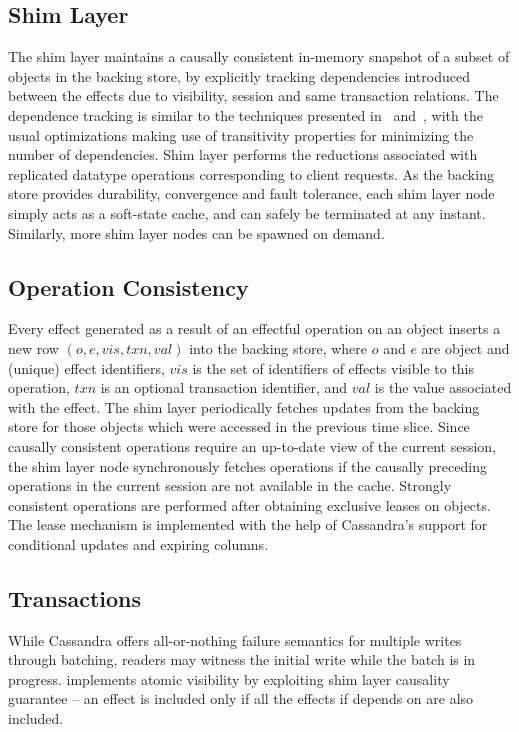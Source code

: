 \subsection{Shim Layer}

The shim layer maintains a causally consistent in-memory snapshot of a subset
of objects in the backing store, by explicitly tracking dependencies introduced
between the effects due to visibility, session and same transaction relations.
The dependence tracking is similar to the techniques presented in~\cite{BoltOn}
and~\cite{Eiger}, with the usual optimizations making use of transitivity
properties for minimizing the number of dependencies. Shim layer performs the
reductions associated with replicated datatype operations corresponding to
client requests. As the backing store provides durability, convergence and
fault tolerance, each shim layer node simply acts as a soft-state cache, and
can safely be terminated at any instant. Similarly, more shim layer nodes can
be spawned on demand.

\subsection{Operation Consistency}

Every effect generated as a result of an effectful operation on an object
inserts a new row $(o,e,vis,txn,val)$ into the backing store, where $o$ and $e$
are object and (unique) effect identifiers, $vis$ is the set of identifiers of
effects visible to this operation, $txn$ is an optional transaction identifier,
and $val$ is the value associated with the effect. The shim layer periodically
fetches updates from the backing store for those objects which were accessed in
the previous time slice. Since causally consistent operations require an
up-to-date view of the current session, the shim layer node synchronously
fetches operations if the causally preceding operations in the current session
are not available in the cache. Strongly consistent operations are performed
after obtaining exclusive leases on objects. The lease mechanism is implemented
with the help of Cassandra's support for conditional updates and expiring
columns.

\subsection{Transactions}

While Cassandra offers all-or-nothing failure semantics for multiple writes
through batching, readers may witness the initial write while the batch is in
progress. \name implements atomic visibility by exploiting shim layer causality
guarantee -- an effect is included only if all the effects if depends on are
also included.

